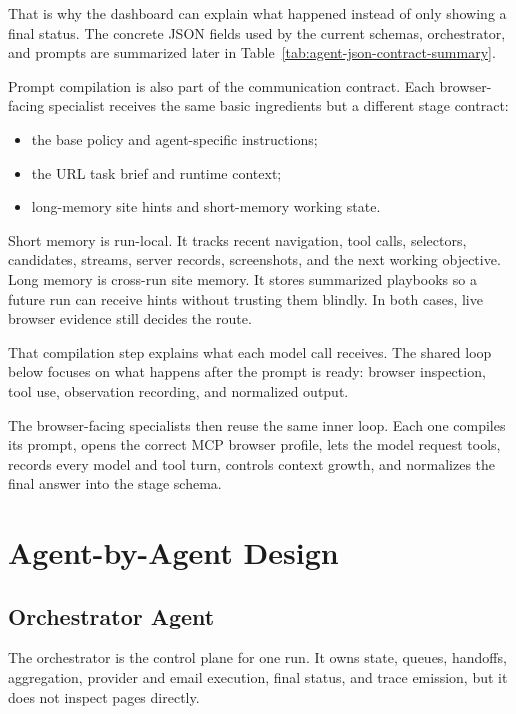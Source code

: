 That is why the dashboard can explain what happened instead of only showing a final
status. The concrete JSON fields used by the current schemas, orchestrator, and prompts
are summarized later in Table~\ref{tab:agent-json-contract-summary}.

Prompt compilation is also part of the communication contract. Each browser-facing
specialist receives the same basic ingredients but a different stage contract:
\begin{itemize}
  \item the base policy and agent-specific instructions;
  \item the URL task brief and runtime context;
  \item long-memory site hints and short-memory working state.
\end{itemize}

Short memory is run-local. It tracks recent navigation, tool calls, selectors,
candidates, streams, server records, screenshots, and the next working objective.
Long memory is cross-run site memory. It stores summarized playbooks so a future run
can receive hints without trusting them blindly. In both cases, live browser evidence
still decides the route.



That compilation step explains what each model call receives. The shared loop
below focuses on what happens after the prompt is ready: browser inspection,
tool use, observation recording, and normalized output.



The browser-facing specialists then reuse the same inner loop. Each one compiles
its prompt, opens the correct MCP browser profile, lets the model request tools,
records every model and tool turn, controls context growth, and normalizes the
final answer into the stage schema.

\FloatBarrier
\clearpage
\section{Agent-by-Agent Design}

\subsection{Orchestrator Agent}

The orchestrator is the control plane for one run. It owns state, queues,
handoffs, aggregation, provider and email execution, final status, and trace
emission, but it does not inspect pages directly.

